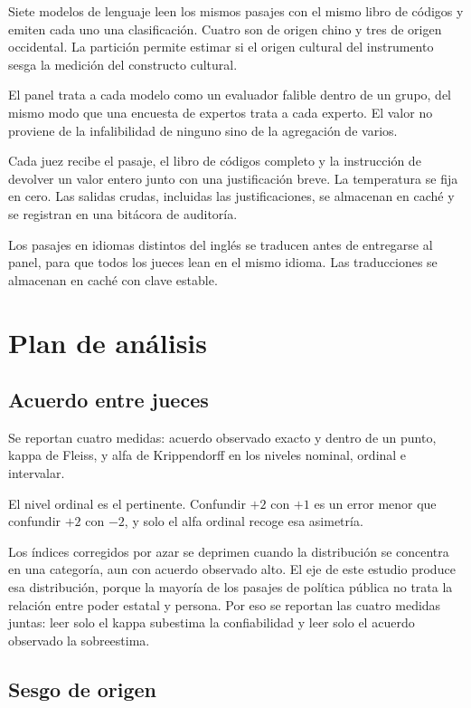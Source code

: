 \documentclass[12pt,letterpaper]{article}
\begin{document}
Siete modelos de lenguaje leen los mismos pasajes con el mismo libro de códigos y emiten cada uno una clasificación. Cuatro son de origen chino y tres de origen occidental. La partición permite estimar si el origen cultural del instrumento sesga la medición del constructo cultural.

El panel trata a cada modelo como un evaluador falible dentro de un grupo, del mismo modo que una encuesta de expertos trata a cada experto. El valor no proviene de la infalibilidad de ninguno sino de la agregación de varios.

Cada juez recibe el pasaje, el libro de códigos completo y la instrucción de devolver un valor entero junto con una justificación breve. La temperatura se fija en cero. Las salidas crudas, incluidas las justificaciones, se almacenan en caché y se registran en una bitácora de auditoría.

Los pasajes en idiomas distintos del inglés se traducen antes de entregarse al panel, para que todos los jueces lean en el mismo idioma. Las traducciones se almacenan en caché con clave estable.


\section{Plan de análisis}

\subsection{Acuerdo entre jueces}

Se reportan cuatro medidas: acuerdo observado exacto y dentro de un punto, kappa de Fleiss, y alfa de Krippendorff en los niveles nominal, ordinal e intervalar.

El nivel ordinal es el pertinente. Confundir $+2$ con $+1$ es un error menor que confundir $+2$ con $-2$, y solo el alfa ordinal recoge esa asimetría.

Los índices corregidos por azar se deprimen cuando la distribución se concentra en una categoría, aun con acuerdo observado alto. El eje de este estudio produce esa distribución, porque la mayoría de los pasajes de política pública no trata la relación entre poder estatal y persona. Por eso se reportan las cuatro medidas juntas: leer solo el kappa subestima la confiabilidad y leer solo el acuerdo observado la sobreestima.

\subsection{Sesgo de origen}
\end{document}
